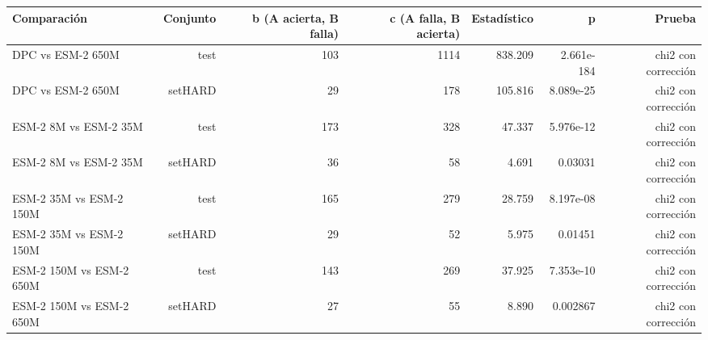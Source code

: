 \begin{tabular}{lrrrrrr}
\toprule
Comparación & Conjunto & b (A acierta, B falla) & c (A falla, B acierta) & Estadístico & p & Prueba \\
\midrule
DPC vs ESM-2 650M & test & 103 & 1114 & 838.209 & 2.661e-184 & chi2 con corrección \\
DPC vs ESM-2 650M & setHARD & 29 & 178 & 105.816 & 8.089e-25 & chi2 con corrección \\
ESM-2 8M vs ESM-2 35M & test & 173 & 328 & 47.337 & 5.976e-12 & chi2 con corrección \\
ESM-2 8M vs ESM-2 35M & setHARD & 36 & 58 & 4.691 & 0.03031 & chi2 con corrección \\
ESM-2 35M vs ESM-2 150M & test & 165 & 279 & 28.759 & 8.197e-08 & chi2 con corrección \\
ESM-2 35M vs ESM-2 150M & setHARD & 29 & 52 & 5.975 & 0.01451 & chi2 con corrección \\
ESM-2 150M vs ESM-2 650M & test & 143 & 269 & 37.925 & 7.353e-10 & chi2 con corrección \\
ESM-2 150M vs ESM-2 650M & setHARD & 27 & 55 & 8.890 & 0.002867 & chi2 con corrección \\
\bottomrule
\end{tabular}
